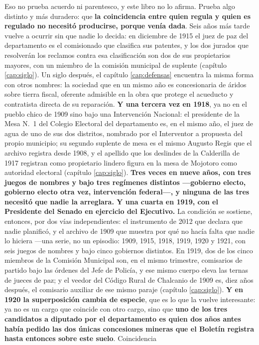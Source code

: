 Eso no prueba acuerdo ni parentesco, y este libro no lo afirma. Prueba algo distinto y más
duradero: que \textbf{la coincidencia entre quien regula y quien es regulado no necesitó
producirse, porque venía dada}. Seis años más tarde vuelve a ocurrir sin que nadie lo decida: en diciembre de 1915 el juez de paz del departamento es el comisionado que clasifica sus patentes, y los dos jurados que resolverán los reclamos contra esa clasificación son dos de sus propietarios mayores, con un miembro de la comisión municipal de suplente (capítulo \ref{cap:siglo}). Un siglo después, el capítulo \ref{cap:defensas} encuentra la misma
forma con otros nombres: la sociedad que en un mismo año es concesionaria de áridos sobre tierra
fiscal, oferente admisible en la obra que protege el acueducto y contratista directa de su
reparación. \textbf{Y una tercera vez en 1918}, ya no en el pueblo chico de 1909 sino bajo una Intervención
Nacional: el presidente de la Mesa N.\ 1 del Colegio Electoral del departamento es, en el mismo
año, el juez de agua de uno de sus dos distritos, nombrado por el Interventor a propuesta del
propio municipio; su segundo suplente de mesa es el mismo Augusto Regis
que el archivo registra desde 1908, y el apellido que los deslindes de la Calderilla de 1917
registran como propietario lindero figura en la mesa de Mojotoro como autoridad electoral
(capítulo \ref{cap:siglo}). \textbf{Tres veces en nueve años, con tres juegos de nombres y bajo
tres regímenes distintos ---gobierno electo, gobierno electo otra vez, intervención federal---,
y ninguna de las tres necesitó que nadie la arreglara. \textbf{Y una cuarta en 1919}, con el
Presidente del Senado en ejercicio del Ejecutivo.} La condición se sostiene, entonces, por dos vías
independientes: el instrumento de 2012 que declara que nadie planificó, y el archivo de 1909 que
muestra por qué no hacía falta que nadie lo hiciera ---una serie, no un episodio: 1909,
1915, 1918, 1919, 1920 y 1921, con seis juegos de nombres y bajo cinco gobiernos distintos. En 1919, dos
de los cinco miembros de la Comisión Municipal son, en el mismo trimestre, comisarios de partido
bajo las órdenes del Jefe de Policía, y ese mismo cuerpo eleva las ternas de jueces de paz; y el
veedor del Código Rural de Chalcanio de 1909 es, diez años después, el comisario auxiliar de ese
mismo paraje (capítulo \ref{cap:siglo}). \textbf{Y en 1920 la superposición cambia de especie},
que es lo que la vuelve interesante: ya no es un cargo que coincide con otro cargo, sino que
\textbf{uno de los tres candidatos a diputado por el departamento es quien dos años antes había
pedido las dos únicas concesiones mineras que el Boletín registra hasta entonces sobre este suelo}. Coincidencia
